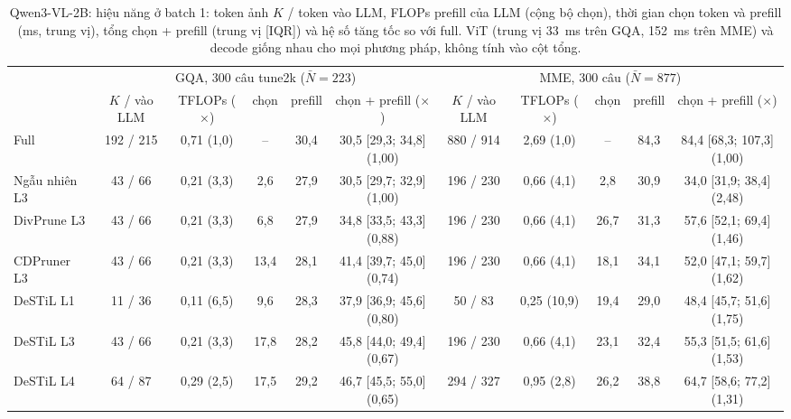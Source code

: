 \documentclass[conference]{IEEEtran}
\begin{document}
\begin{table}[!t]
\centering
\caption{Qwen3-VL-2B: hiệu năng ở batch 1: token ảnh $K$ / token vào LLM, FLOPs prefill của LLM (cộng bộ chọn), thời gian chọn token và prefill (ms, trung vị), tổng chọn + prefill (trung vị [IQR]) và hệ số tăng tốc so với full. ViT (trung vị 33~ms trên GQA, 152~ms trên MME) và decode giống nhau cho mọi phương pháp, không tính vào cột tổng.}
\label{tab:timing}
\setlength{\tabcolsep}{3pt}
\footnotesize
\begin{tabular}{@{}lccccc|ccccc@{}}
\toprule
& \multicolumn{5}{c|}{GQA, 300 câu tune2k ($\bar N=223$)} & \multicolumn{5}{c}{MME, 300 câu ($\bar N=877$)}\\
& $K$ / vào LLM & TFLOPs ($\times$) & chọn & prefill & chọn + prefill ($\times$) & $K$ / vào LLM & TFLOPs ($\times$) & chọn & prefill & chọn + prefill ($\times$)\\
\midrule
Full & 192 / 215 & 0,71 (1,0) & -- & 30,4 & 30,5 [29,3; 34,8] (1,00) & 880 / 914 & 2,69 (1,0) & -- & 84,3 & 84,4 [68,3; 107,3] (1,00)\\
Ngẫu nhiên L3 & 43 / 66 & 0,21 (3,3) & 2,6 & 27,9 & 30,5 [29,7; 32,9] (1,00) & 196 / 230 & 0,66 (4,1) & 2,8 & 30,9 & 34,0 [31,9; 38,4] (2,48)\\
DivPrune L3 & 43 / 66 & 0,21 (3,3) & 6,8 & 27,9 & 34,8 [33,5; 43,3] (0,88) & 196 / 230 & 0,66 (4,1) & 26,7 & 31,3 & 57,6 [52,1; 69,4] (1,46)\\
CDPruner L3 & 43 / 66 & 0,21 (3,3) & 13,4 & 28,1 & 41,4 [39,7; 45,0] (0,74) & 196 / 230 & 0,66 (4,1) & 18,1 & 34,1 & 52,0 [47,1; 59,7] (1,62)\\
DeSTiL L1 & 11 / 36 & 0,11 (6,5) & 9,6 & 28,3 & 37,9 [36,9; 45,6] (0,80) & 50 / 83 & 0,25 (10,9) & 19,4 & 29,0 & 48,4 [45,7; 51,6] (1,75)\\
DeSTiL L3 & 43 / 66 & 0,21 (3,3) & 17,8 & 28,2 & 45,8 [44,0; 49,4] (0,67) & 196 / 230 & 0,66 (4,1) & 23,1 & 32,4 & 55,3 [51,5; 61,6] (1,53)\\
DeSTiL L4 & 64 / 87 & 0,29 (2,5) & 17,5 & 29,2 & 46,7 [45,5; 55,0] (0,65) & 294 / 327 & 0,95 (2,8) & 26,2 & 38,8 & 64,7 [58,6; 77,2] (1,31)\\
\bottomrule
\end{tabular}
\end{table}
\end{document}
